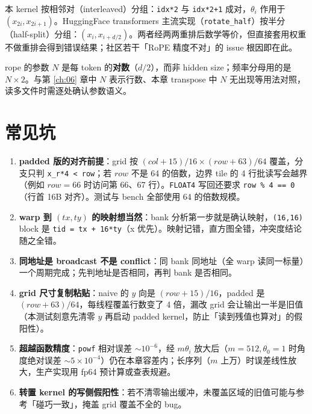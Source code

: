 \begin{kaogu}
本 kernel 按相邻对（interleaved）分组：\texttt{idx*2} 与 \texttt{idx*2+1} 成对，$\theta_i$ 作用于 $(x_{2i}, x_{2i+1})$。HuggingFace transformers 主流实现（\texttt{rotate\_half}）按半分（half-split）分组：$(x_i, x_{i+d/2})$。两者经两两重排后数学等价，但直接套用权重不做重排会得到错误结果；社区若干「RoPE 精度不对」的 issue 根因即在此。
\end{kaogu}

\begin{kaogu}[F3 | 参数 N 的语义易误读]
rope 的参数 $N$ 是每 token 的\textbf{对数}（$d/2$），而非 hidden size；频率分母用的是 $N \times 2$。与第 \ref{ch:06} 章中 $N$ 表示行数、本章 transpose 中 $N$ 无出现等用法对照，读多文件时需逐处确认参数语义。
\end{kaogu}

\section{常见坑}

\begin{enumerate}
  \item \textbf{padded 版的对齐前提}：grid 按 $(col+15)/16 \times (row+63)/64$ 覆盖，分支只判 \texttt{x\_r*4 < row}；若 $row$ 不是 64 的倍数，边界 tile 的 4 行批读写会越界（例如 $row = 66$ 时访问第 66、67 行）。\texttt{FLOAT4} 写回还要求 \texttt{row \% 4 == 0}（行首 16B 对齐）。测试与 bench 全部使用 64 的倍数规模。
  \item \textbf{warp 到 $(tx,ty)$ 的映射想当然}：bank 分析第一步就是确认映射，\texttt{(16,16)} block 是 \texttt{tid = tx + 16*ty}（x 优先）。映射记错，直方图全错，冲突度结论随之全错。
  \item \textbf{同地址是 broadcast 不是 conflict}：同 bank 同地址（全 warp 读同一标量）一个周期完成；先判地址是否相同，再判 bank 是否相同。
  \item \textbf{grid 尺寸复制粘贴}：naive 的 $y$ 向是 $(row+15)/16$，padded 是 $(row+63)/64$，每线程覆盖行数变了 4 倍，漏改 grid 会让输出一半是旧值（本测试刻意先清零 $y$ 再启动 padded kernel，防止「读到残值也算对」的假阳性）。
  \item \textbf{超越函数精度}：\texttt{powf} 相对误差 $\sim 10^{-6}$，经 $m\theta_i$ 放大后（$m = 512, \theta_0 = 1$ 时角度绝对误差 $\sim 5 \times 10^{-4}$）仍在本章容差内；长序列（$m$ 上万）时误差线性放大，生产实现用 fp64 预计算或查表规避。
  \item \textbf{转置 kernel 的写侧假阳性}：若不清零输出缓冲，未覆盖区域的旧值可能与参考「碰巧一致」，掩盖 grid 覆盖不全的 bug。
\end{enumerate}

